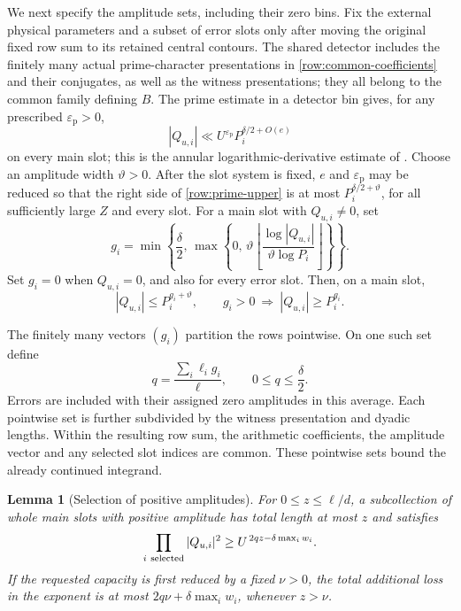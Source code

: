 \documentclass[11pt,a4paper]{article}
\numberwithin{equation}{section}
\newtheorem{lemma}[theorem]{Lemma}
\theoremstyle{definition}
\theoremstyle{remark}
\newcommand{\eps}{\varepsilon}
\begin{document}
We next specify the amplitude sets, including their zero bins.
Fix the external physical parameters and a subset of error slots only
after moving the original fixed row sum to its retained central
contours.  The shared detector includes the finitely many actual
prime-character presentations in \eqref{row:common-coefficients} and
their conjugates, as well as the witness presentations; they all belong
to the common family defining \(B\).  The prime estimate in a detector bin gives, for any
prescribed \(\eps_{\mathrm p}>0\),
\begin{equation}\label{row:prime-upper}
 |Q_{u,i}|\ll U^{\eps_{\mathrm p}}P_i^{\delta/2+O(e)}
\end{equation}
on every main slot; this is the annular logarithmic-derivative estimate
of \cite[Lemma 19.1]{Q}.  Choose an amplitude width
\(\vartheta>0\).  After the slot system is fixed, \(e\) and
\(\eps_{\mathrm p}\) may be reduced so that the right side of
\eqref{row:prime-upper} is at most \(P_i^{\delta/2+\vartheta}\),
for all sufficiently large \(Z\) and every slot.
For a main slot with \(Q_{u,i}\ne0\), set
\[
 g_i=\min\left\{\frac\delta2,\,
       \max\left\{0,\,
          \vartheta\left\lfloor
           \frac{\log|Q_{u,i}|}{\vartheta\log P_i}
          \right\rfloor\right\}\right\}.
\]
Set \(g_i=0\) when \(Q_{u,i}=0\), and also for every error slot.
Then, on a main slot,
\begin{equation}\label{row:amplitude-bins}
 |Q_{u,i}|\le P_i^{g_i+\vartheta},\qquad
 g_i>0\ \Longrightarrow\ |Q_{u,i}|\ge P_i^{g_i}.
\end{equation}

The finitely many vectors \((g_i)\) partition the rows pointwise.
On one such set define
\begin{equation}\label{row:mean-amplitude}
 q=\frac{\sum_i\ell_i g_i}{\ell},
 \qquad 0\le q\le\frac\delta2.
\end{equation}
Errors are included with their assigned zero amplitudes in this
average.  Each pointwise set is further subdivided by the witness
presentation and dyadic lengths.  Within the resulting row sum, the
arithmetic coefficients, the amplitude vector and any selected slot
indices are common.  These pointwise sets bound the already continued integrand.

\begin{lemma}[Selection of positive amplitudes]\label{row:selection}
For \(0\le z\le\ell/d\), a subcollection of whole main slots with
positive amplitude has total length at most \(z\) and satisfies
\begin{equation}\label{row:selection-spike}
 \prod_{i\ {\rm selected}}|Q_{u,i}|^2
 \ge U^{\,2qz-\delta\max_i w_i}.
\end{equation}
If the requested capacity is first reduced by a fixed \(\nu>0\),
the total additional loss in the exponent is at most
\(2q\nu+\delta\max_i w_i\), whenever \(z>\nu\).
\end{lemma}
\end{document}
